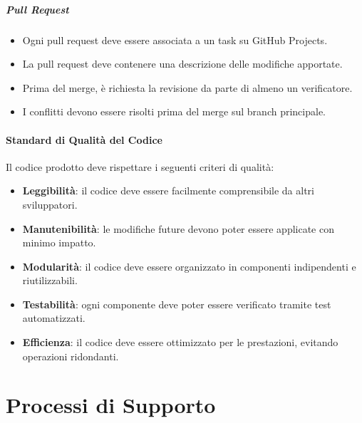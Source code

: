 \documentclass[a4paper, 11pt, oneside]{scrartcl} %
\begin{document}
\subparagraph{Pull Request}
\begin{itemize}
    \item Ogni pull request{\scriptsize{}} deve essere associata a un task su GitHub Projects{\scriptsize{}}.
    \item La pull request deve contenere una descrizione delle modifiche apportate.
    \item Prima del merge, è richiesta la revisione da parte di almeno un verificatore.
    \item I conflitti devono essere risolti prima del merge sul branch principale.
\end{itemize}

\paragraph{Standard di Qualità del Codice}
Il codice prodotto deve rispettare i seguenti criteri di qualità:
\begin{itemize}
    \item \textbf{Leggibilità}: il codice deve essere facilmente comprensibile da altri sviluppatori.
    \item \textbf{Manutenibilità}: le modifiche future devono poter essere applicate con minimo impatto.
    \item \textbf{Modularità}: il codice deve essere organizzato in componenti indipendenti e riutilizzabili.
    \item \textbf{Testabilità}: ogni componente deve poter essere verificato tramite test automatizzati.
    \item \textbf{Efficienza}: il codice deve essere ottimizzato per le prestazioni, evitando operazioni ridondanti.
\end{itemize}








\newpage
\section{Processi di Supporto}

 
\end{document}
